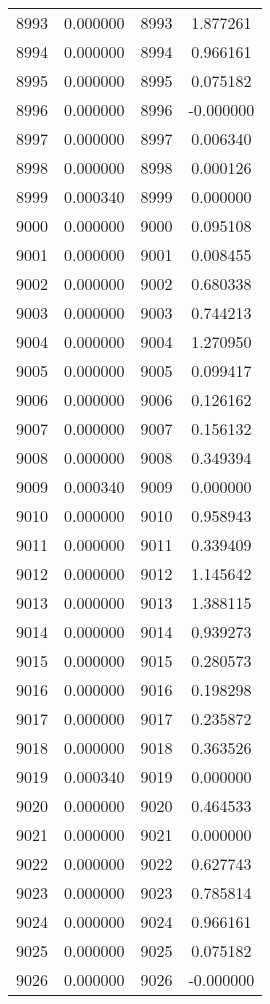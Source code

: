 \documentclass[12pt]{article}
\begin{document}
\begin{longtable}{@{}cccc@{}}
8993 & 0.000000 & 8993 & 1.877261 \\
8994 & 0.000000 & 8994 & 0.966161 \\
8995 & 0.000000 & 8995 & 0.075182 \\
8996 & 0.000000 & 8996 & -0.000000 \\
8997 & 0.000000 & 8997 & 0.006340 \\
8998 & 0.000000 & 8998 & 0.000126 \\
8999 & 0.000340 & 8999 & 0.000000 \\
9000 & 0.000000 & 9000 & 0.095108 \\
9001 & 0.000000 & 9001 & 0.008455 \\
9002 & 0.000000 & 9002 & 0.680338 \\
9003 & 0.000000 & 9003 & 0.744213 \\
9004 & 0.000000 & 9004 & 1.270950 \\
9005 & 0.000000 & 9005 & 0.099417 \\
9006 & 0.000000 & 9006 & 0.126162 \\
9007 & 0.000000 & 9007 & 0.156132 \\
9008 & 0.000000 & 9008 & 0.349394 \\
9009 & 0.000340 & 9009 & 0.000000 \\
9010 & 0.000000 & 9010 & 0.958943 \\
9011 & 0.000000 & 9011 & 0.339409 \\
9012 & 0.000000 & 9012 & 1.145642 \\
9013 & 0.000000 & 9013 & 1.388115 \\
9014 & 0.000000 & 9014 & 0.939273 \\
9015 & 0.000000 & 9015 & 0.280573 \\
9016 & 0.000000 & 9016 & 0.198298 \\
9017 & 0.000000 & 9017 & 0.235872 \\
9018 & 0.000000 & 9018 & 0.363526 \\
9019 & 0.000340 & 9019 & 0.000000 \\
9020 & 0.000000 & 9020 & 0.464533 \\
9021 & 0.000000 & 9021 & 0.000000 \\
9022 & 0.000000 & 9022 & 0.627743 \\
9023 & 0.000000 & 9023 & 0.785814 \\
9024 & 0.000000 & 9024 & 0.966161 \\
9025 & 0.000000 & 9025 & 0.075182 \\
9026 & 0.000000 & 9026 & -0.000000 \\

\end{longtable}
\end{document}
